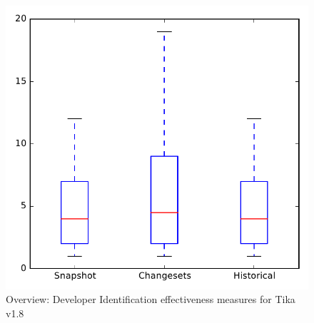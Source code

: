 
\begin{figure}
\centering
\includegraphics[height=0.4\textheight]{figures/dit/all_tika_no_outlier}
\caption{Overview: Developer Identification effectiveness measures for Tika v1.8}
\label{fig:dit:all:tika}
\end{figure}
